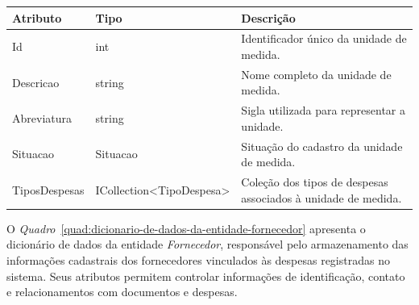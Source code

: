 \begin{quadro}[H]
\caption[Dicionário de dados da entidade UnidadeMedida]{Dicionário de dados da entidade UnidadeMedida}
\label{quad:dicionario-de-dados-da-entidade-unidademedida}

\begin{tabular}{|p{}|p{}|p{}|}
\hline
\textbf{Atributo} & \textbf{Tipo} & \textbf{Descrição} \\ 
\hline
Id & int & Identificador único da unidade de medida. \\ 
\hline
Descricao & string & Nome completo da unidade de medida. \\ 
\hline
Abreviatura & string & Sigla utilizada para representar a unidade. \\ 
\hline
Situacao & Situacao & Situação do cadastro da unidade de medida. \\ 
\hline
TiposDespesas & ICollection<TipoDespesa> & Coleção dos tipos de despesas associados à unidade de medida. \\ 
\hline
\end{tabular}


\end{quadro}


O \textit{Quadro}~\ref{quad:dicionario-de-dados-da-entidade-fornecedor} apresenta o dicionário de dados da entidade \textit{Fornecedor}, responsável pelo armazenamento das informações cadastrais dos fornecedores vinculados às despesas registradas no sistema. Seus atributos permitem controlar informações de identificação, contato e relacionamentos com documentos e despesas.

